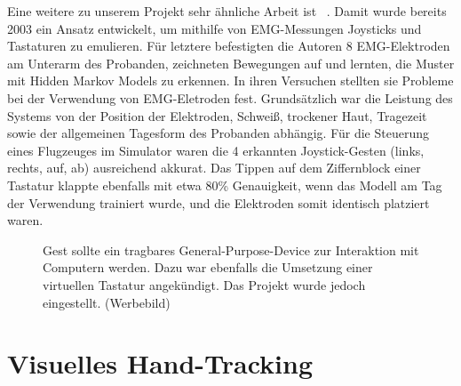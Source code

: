 Eine weitere zu unserem Projekt sehr ähnliche Arbeit ist
~\citep{nasa-joystick-keyboard}. Damit wurde
bereits 2003 ein Ansatz entwickelt, um mithilfe von EMG-Messungen Joysticks und
Tastaturen zu emulieren. Für letztere befestigten die Autoren 8 EMG-Elektroden
am Unterarm des Probanden, zeichneten Bewegungen auf und lernten, die Muster
mit Hidden Markov Models zu erkennen.  In ihren Versuchen stellten sie Probleme
bei der Verwendung von EMG-Eletroden fest. Grundsätzlich war die Leistung des
Systems von der Position der Elektroden, Schweiß, trockener Haut, Tragezeit
sowie der allgemeinen Tagesform des Probanden abhängig. Für die Steuerung eines
Flugzeuges im Simulator waren die 4 erkannten Joystick-Gesten (links, rechts,
auf, ab) ausreichend akkurat. Das Tippen auf dem Ziffernblock einer Tastatur
klappte ebenfalls mit etwa 80\% Genauigkeit, wenn das Modell am Tag der
Verwendung trainiert wurde, und die Elektroden somit identisch platziert waren.

\vfill
\begin{figure}[h]
    \centering
    \caption[Gest (Werbebild)~\cite{web:gest}]{Gest sollte ein tragbares
    General-Purpose-Device zur Interaktion mit Computern werden. Dazu war
    ebenfalls die Umsetzung einer virtuellen Tastatur angekündigt. Das Projekt
    wurde jedoch eingestellt. (Werbebild)}
\end{figure}


\section{Visuelles Hand-Tracking}

